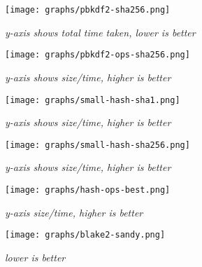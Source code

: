 \begin{figure}[htpb]
\centering
\texttt{[image: graphs/pbkdf2-sha256.png]}
\caption{\small \sl y-axis shows total time taken, lower is better
\label{fig:pbkdf2-sha256}}
\end{figure}

\begin{figure}[htpb]
\centering
\texttt{[image: graphs/pbkdf2-ops-sha256.png]}
\caption{\small \sl y-axis shows size/time, higher is better
\label{fig:pbkdf2-ops-sha256}}
\end{figure}

\begin{figure}[htpb]
\centering
\texttt{[image: graphs/small-hash-sha1.png]}
\caption{\small \sl y-axis shows size/time, higher is better
\label{fig:small-hash-sha1}}
\end{figure}

\begin{figure}[htpb]
\centering
\texttt{[image: graphs/small-hash-sha256.png]}
\caption{\small \sl y-axis shows size/time, higher is better
\label{fig:small-hash-sha256}}
\end{figure}

\begin{figure}[htpb]
\centering
\texttt{[image: graphs/hash-ops-best.png]}
\caption{\small \sl y-axis size/time, higher is better
\label{fig:hash-ops-best}}
\end{figure} 

\begin{figure}[htpb]
\centering
\texttt{[image: graphs/blake2-sandy.png]}
\caption{\small \sl lower is better
\label{fig:blake2-sandy}}
\end{figure}

